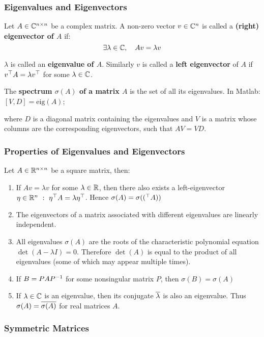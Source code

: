 \subsubsection{Eigenvalues and Eigenvectors}%
\label{ssub:eigenvalues_and_eigenvectors}

Let $A \in \mathbb{C}^{n \times n}$ be a complex matrix.
A non-zero vector $v \in \mathbb{C}^n$ is called a \textbf{(right) eigenvector of $A$} if:
	\[\exists \lambda \in \mathbb{C}, \quad Av = \lambda v\]

$\lambda$ is called an \textbf{eigenvalue of $A$}.
Similarly $v$ is called a \textbf{left eigenvector} of $A$ if
$v^{\top}A = \lambda v^{\top}$ for some $\lambda \in \mathbb{C}$.

The \textbf{spectrum $\sigma(A)$ of a matrix $A$} is the set of all its eigenvalues.
In Matlab: $[V,D] = \text{eig} (A)$;

where $D$ is a diagonal matrix containing the eigenvalues and
$V$ is a matrix whose columns are the corresponding eigenvectors,
such that $AV = VD$.


\subsubsection{Properties of Eigenvalues and Eigenvectors}%
\label{ssub:properties_of_eigenvalues_and_eigenvectors}

Let $A \in \mathbb{R}^{n \times n}$ be a square matrix, then:
\begin{enumerate}
	\item If $Av = \lambda v$ for some $\lambda \in \mathbb{R}$, then there also exists a
		left-eigenvector $\eta \in \Rn \ : \ \tr{\eta}A = \lambda \tr{\eta}$.
		Hence $\sigma(A) = \sigma((^{\top}A))$
	\item The eigenvectors of a matrix associated with different
		eigenvalues are linearly independent.
	\item All eigenvalues $\sigma(A)$ are the roots of the characteristic
		polynomial equation $\det(A - \lambda I) = 0$.
		Therefore $\det(A)$ is equal to the product of all eigenvalues
		(some of which may appear multiple times).
	\item If $B = PAP^{-1}$ for some nonsingular matrix $P$,
		then $\sigma(B) = \sigma(A)$
	\item If $\lambda \in \mathbb{C}$ is an eigenvalue, then its conjugate
		$\overline{\lambda}$ is also an eigenvalue.
		Thus $\sigma(A) = \overline{\sigma(A)}$ for real matrices $A$.
\end{enumerate}


\subsubsection{Symmetric Matrices}%
\label{ssub:symmetric_matrices}

